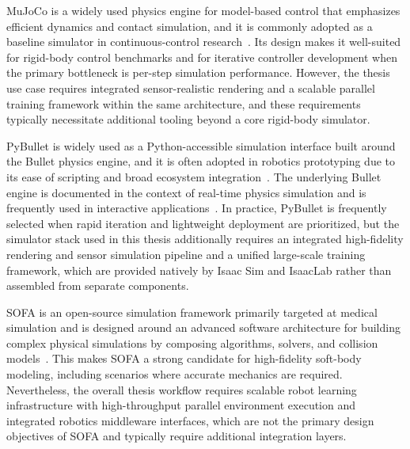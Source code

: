 MuJoCo is a widely used physics engine for model-based control that emphasizes efficient dynamics and contact simulation, and it is commonly adopted as a baseline simulator in continuous-control research~\cite{Todorov2012MuJoCo}. Its design makes it well-suited for rigid-body control benchmarks and for iterative controller development when the primary bottleneck is per-step simulation performance. However, the thesis use case requires integrated sensor-realistic rendering and a scalable parallel training framework within the same architecture, and these requirements typically necessitate additional tooling beyond a core rigid-body simulator.

PyBullet is widely used as a Python-accessible simulation interface built around the Bullet physics engine, and it is often adopted in robotics prototyping due to its ease of scripting and broad ecosystem integration~\cite{pybullet_homepage}. The underlying Bullet engine is documented in the context of real-time physics simulation and is frequently used in interactive applications~\cite{Coumans2015Bullet}. In practice, PyBullet is frequently selected when rapid iteration and lightweight deployment are prioritized, but the simulator stack used in this thesis additionally requires an integrated high-fidelity rendering and sensor simulation pipeline and a unified large-scale training framework, which are provided natively by Isaac Sim and IsaacLab rather than assembled from separate components.

SOFA is an open-source simulation framework primarily targeted at medical simulation and is designed around an advanced software architecture for building complex physical simulations by composing algorithms, solvers, and collision models~\cite{Allard2007SOFA}. This makes SOFA a strong candidate for high-fidelity soft-body modeling, including scenarios where accurate mechanics are required. Nevertheless, the overall thesis workflow requires scalable robot learning infrastructure with high-throughput parallel environment execution and integrated robotics middleware interfaces, which are not the primary design objectives of SOFA and typically require additional integration layers.

